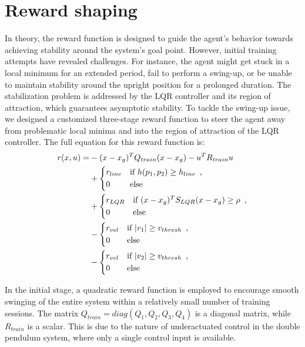\section{Reward shaping}
In theory, the reward function is designed to guide the agent's behavior towards achieving stability around the system's goal point. However, initial training attempts have revealed challenges. For instance, the agent might get stuck in a local minimum for an extended period, fail to perform a swing-up, or be unable to maintain stability around the upright position for a prolonged duration. The stabilization problem is addressed by the LQR controller and its region of attraction, which guarantees asymptotic stability. To tackle the swing-up issue, we designed a customized three-stage reward function to steer the agent away from problematic local minima and into the region of attraction of the LQR controller. The full equation for this reward function is:
\begin{equation}
\begin{aligned}
 r(x,u) = &-(x - x_g)^T Q_{train} (x - x_g) - u^T R_{train}u \\
           & +
            \begin{dcases*}
              r_{line} & \text{if} $h(p_1, p_2) \geq h_{line}$\, ,\\
              0 & \text{else}
            \end{dcases*}\\
           & +
            \begin{dcases*}
              r_{LQR} & \text{if} $(x - x_g)^T S_{LQR} (x - x_g) \geq \rho $\, ,\\
              0 & \text{else}
            \end{dcases*}\\
           & -
            \begin{dcases*}
              r_{vel} & \text{if} $|v_1| \geq v_{thresh}$\, ,\\
              0 & \text{else}
            \end{dcases*}\\
           & -
            \begin{dcases*}
              r_{vel} & \text{if} $|v_2| \geq v_{thresh}$\, ,\\
              0 & \text{else}
            \end{dcases*}
\end{aligned}
\end{equation}

In the initial stage, a quadratic reward function is employed to encourage
smooth swinging of the entire system within a relatively small number of
training sessions. The matrix  \(Q_{train} = diag(Q_1, Q_2, Q_3, Q_4)\) is a
diagonal matrix, while \(R_{train}\) is a scalar. This is due to the nature
of underactuated control in the double pendulum system, where only a single
control input is available.


